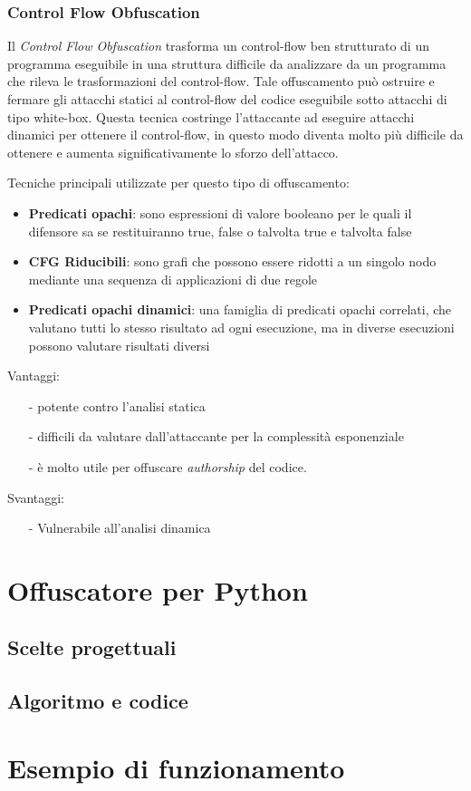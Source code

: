 \documentclass[a4paper,oneside,openright,titlepage,10pt,footinclude,headinclude]{scrbook}
\begin{document}
\subsection{Control Flow Obfuscation}
Il \emph{Control Flow Obfuscation} trasforma un control-flow ben strutturato di un programma eseguibile in una struttura difficile da analizzare da un programma che rileva le trasformazioni del control-flow. Tale offuscamento può ostruire e fermare gli attacchi statici al control-flow del codice eseguibile sotto attacchi di tipo white-box. Questa tecnica costringe l'attaccante ad eseguire attacchi dinamici per ottenere il control-flow, in questo modo diventa molto più difficile da ottenere e aumenta significativamente lo sforzo dell'attacco.

\noindent Tecniche principali utilizzate per questo tipo di offuscamento:
\begin{itemize}
\item
\textbf{Predicati opachi}: sono espressioni di valore booleano per le quali il difensore sa se restituiranno true, false o talvolta true e talvolta false
\item
\textbf{CFG Riducibili}: sono grafi che possono essere ridotti a un singolo nodo mediante una sequenza di applicazioni di due regole
\item
\textbf{Predicati opachi dinamici}: una famiglia di predicati opachi correlati, che valutano tutti lo stesso risultato ad ogni esecuzione, ma in diverse esecuzioni possono valutare risultati diversi
\end{itemize}

Vantaggi: 
\begin{itemize}
\item[-]
potente contro l'analisi statica
\item[-]
difficili da valutare dall'attaccante per la complessità esponenziale
\item[-]
è molto utile per offuscare \emph{authorship} del codice.
\end{itemize}

Svantaggi:
\begin{itemize}
\item[-]
Vulnerabile all'analisi dinamica 
\end{itemize}
 

\chapter{Offuscatore per Python}\label{offuscatore}

\section{Scelte progettuali}\label{offuscatore_scelte}

\section{Algoritmo e codice}\label{offuscatore_algo}


\chapter{Esempio di funzionamento}\label{esempio}


\begin{thebibliography}{9}

\end{thebibliography}
\end{document}
